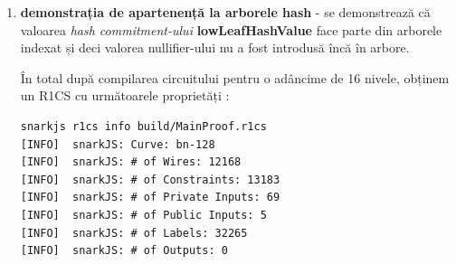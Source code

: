 \documentclass[12pt, letterpaper]{article}
\begin{document}
\begin{enumerate}
    \item{\textbf{demonstrația de apartenență la arborele hash} - se demonstrează că valoarea \emph{hash commitment-ului} \textbf{lowLeafHashValue} face parte din arborele indexat și deci valorea nullifier-ului nu a fost introdusă încă în arbore.}

În total după compilarea circuitului pentru o adâncime de 16 nivele, obținem un R1CS cu următoarele proprietăți :

\begin{lstlisting}
snarkjs r1cs info build/MainProof.r1cs
[INFO]  snarkJS: Curve: bn-128
[INFO]  snarkJS: # of Wires: 12168
[INFO]  snarkJS: # of Constraints: 13183
[INFO]  snarkJS: # of Private Inputs: 69
[INFO]  snarkJS: # of Public Inputs: 5
[INFO]  snarkJS: # of Labels: 32265
[INFO]  snarkJS: # of Outputs: 0
\end{lstlisting}
\end{enumerate}
\printbibliography
\end{document}
